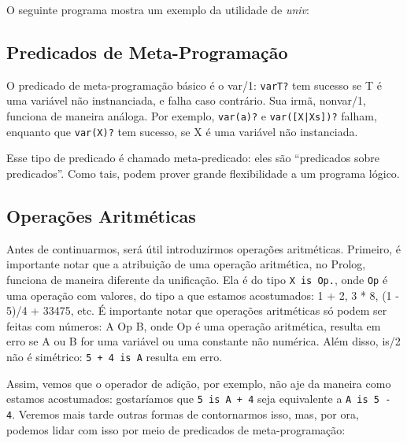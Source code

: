 \documentclass{article}
\theoremstyle{remark}
\theoremstyle{theorem}
\begin{document}
O seguinte programa mostra um exemplo da utilidade de \textit{univ}:



\subsection{Predicados de Meta-Programação}

O predicado de meta-programação básico é o var/1: {\tt var{T}?} tem sucesso se T é uma variável não instnanciada, e falha caso contrário. Sua irmã, nonvar/1, funciona de maneira análoga. Por exemplo, {\tt var(a)?} e {\tt var([X|Xs])?} falham, enquanto que {\tt var(X)?} tem sucesso, se X é uma variável não instanciada.

Esse tipo de predicado é chamado meta-predicado: eles são ``predicados sobre predicados''. Como tais, podem prover grande flexibilidade a um programa lógico.


\subsection{Operações Aritméticas}

Antes de continuarmos, será útil introduzirmos operações aritméticas. Primeiro, é importante notar que a atribuição de uma operação aritmética, no Prolog, funciona de maneira diferente da unificação. Ela é do tipo {\tt X is Op.}, onde {\tt Op} é uma operação com valores, do tipo a que estamos acostumados: 1 + 2, 3 * 8, (1 - 5)/4 + 33475, etc. É importante notar que operações aritméticas só podem ser feitas com números: A Op B, onde Op é  uma operação aritmética, resulta em erro se
A ou B for uma variável ou uma constante não numérica. Além disso, is/2 não é simétrico: {\tt 5 + 4 is A} resulta em erro.

Assim, vemos que o operador de adição, por exemplo, não aje da maneira como estamos acostumados: gostaríamos que {\tt 5 is A + 4} seja equivalente a {\tt A is 5 - 4}. Veremos mais tarde outras formas de contornarmos isso, mas, por ora, podemos lidar com isso por meio de predicados de meta-programação:
\\


\end{document}

